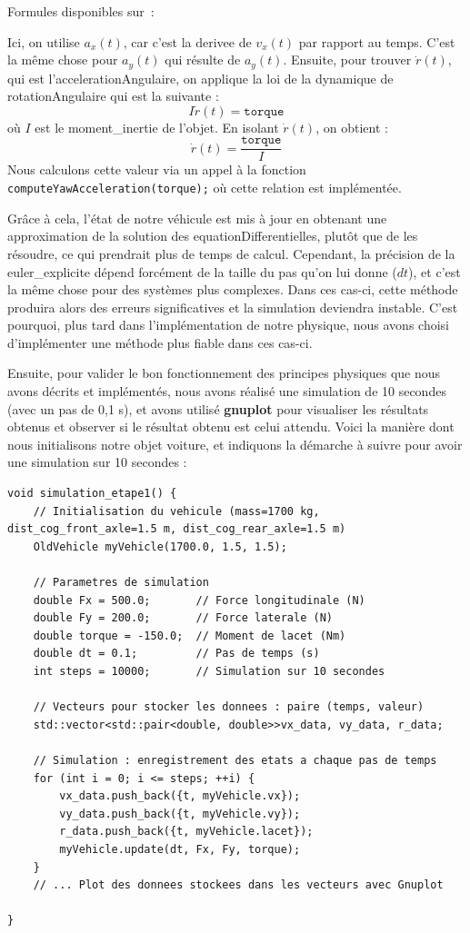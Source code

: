 \begin{center}
    Formules disponibles sur~\cite{euler_explicite}:
\end{center}

Ici, on utilise $a_x(t)$, car c'est la \gls{derivee} de $v_x(t)$ par rapport au temps.
C'est la même chose pour $a_y(t)$ qui résulte de $a_y(t)$.
Ensuite, pour trouver $\dot{r}(t)$, qui est l'\gls{accelerationAngulaire}, on applique la loi de la dynamique de \gls{rotationAngulaire} qui est la suivante :
$$I\dot{r}(t) = \texttt{torque}$$
où $I$ est le \gls{moment_inertie} de l'objet.
En isolant $\dot{r}(t)$, on obtient :
$$\dot{r}(t)= \frac{\texttt{torque}}{I}$$
Nous calculons cette valeur via un appel à la fonction \texttt{computeYawAcceleration(torque);} où cette relation est implémentée.

Grâce à cela, l'état de notre véhicule est mis à jour en obtenant une approximation de la solution des \glspl{equationDifferentielle}, plutôt que de les résoudre, ce qui prendrait plus de temps de calcul.
Cependant, la précision de la \gls{euler_explicite} dépend forcément de la taille du pas qu'on lui donne ($dt$), et c'est la même chose pour des systèmes plus complexes.
Dans ces cas-ci, cette méthode produira alors des erreurs significatives et la simulation deviendra instable.
C'est pourquoi, plus tard dans l'implémentation de notre physique, nous avons choisi d'implémenter une méthode plus fiable dans ces cas-ci.

Ensuite, pour valider le bon fonctionnement des principes physiques que nous avons décrits et implémentés, nous avons réalisé une simulation de 10 secondes (avec un pas de 0,1 s), et avons utilisé \textbf{\gls{gnuplot}} pour visualiser les résultats obtenus et observer si le résultat obtenu est celui attendu.
Voici la manière dont nous initialisons notre objet voiture, et indiquons la démarche à suivre pour avoir une simulation sur 10 secondes :

\begin{lstlisting}[style=CStyle,label={lst:void_simulation_etape1}]
void simulation_etape1() {
    // Initialisation du vehicule (mass=1700 kg, dist_cog_front_axle=1.5 m, dist_cog_rear_axle=1.5 m)
    OldVehicle myVehicle(1700.0, 1.5, 1.5);

    // Parametres de simulation
    double Fx = 500.0;       // Force longitudinale (N)
    double Fy = 200.0;       // Force laterale (N)
    double torque = -150.0;  // Moment de lacet (Nm)
    double dt = 0.1;         // Pas de temps (s)
    int steps = 10000;       // Simulation sur 10 secondes

    // Vecteurs pour stocker les donnees : paire (temps, valeur)
    std::vector<std::pair<double, double>>vx_data, vy_data, r_data;

    // Simulation : enregistrement des etats a chaque pas de temps
    for (int i = 0; i <= steps; ++i) {
        vx_data.push_back({t, myVehicle.vx});
        vy_data.push_back({t, myVehicle.vy});
        r_data.push_back({t, myVehicle.lacet});
        myVehicle.update(dt, Fx, Fy, torque);
    }
    // ... Plot des donnees stockees dans les vecteurs avec Gnuplot

}
\end{lstlisting}

